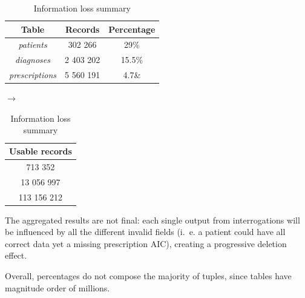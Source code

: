 \begin{table}[!htb]
	
	\centering
	\begin{minipage}[c]{0.4\linewidth}
				\begin{tabular}{c|c|c}
				\textbf{Table} & \textbf{Records} & \textbf{Percentage} \\
				\hline
				\textit{patients} & 302 266 & 29\% \\
				\hline
				\textit{diagnoses} & 2 403 202 & 15.5\% \\
				\hline
				\textit{prescriptions} & 5 560 191 & 4.7\& \\
			\end{tabular}
	\end{minipage}
	\qquad
	\begin{minipage}[c]{0.4\linewidth}
		\qquad
		\centering
		$\rightarrow$
		\qquad
		\begin{tabular}{c}
			\textbf{Usable records} \\
			\hline
			713 352 \\
			\hline
			13 056 997 \\
			\hline
			113 156 212 \\
		\end{tabular}
		
	\end{minipage}
	\caption{\small Information loss summary}
\end{table}



The aggregated results are not final: each single output from interrogations will be influenced by all the different invalid fields (i.\ e. a patient could have all correct data yet a missing prescription AIC), creating a progressive deletion effect.

Overall, percentages do not compose the majority of tuples, since tables have magnitude order of millions.

